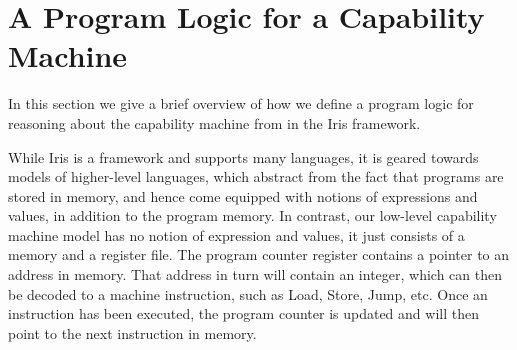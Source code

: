 \documentclass[sigplan,review]{acmart}\settopmatter{printfolios=true,printccs=false,printacmref=false}
\begin{document}
\section{A Program Logic for a Capability Machine}



In this section we give a brief overview of how we define a program logic
for reasoning about the capability machine from \cite{skorstengaardESOP18} in the Iris framework.

While Iris is a framework and supports many languages, it is geared towards models of higher-level languages, which abstract from the fact that programs are stored in memory, and hence come equipped with notions of expressions and values, in addition to the program memory.
In contrast, our low-level capability machine model has no notion of expression and values, it just consists of a memory and a register file.
The program counter register contains a pointer to an address in memory.
That address in turn will contain an integer, which can then be decoded to a machine instruction, such as Load, Store, Jump, etc.
Once an instruction has been executed, the program counter is updated and will then point to the next instruction in memory.
\end{document}
